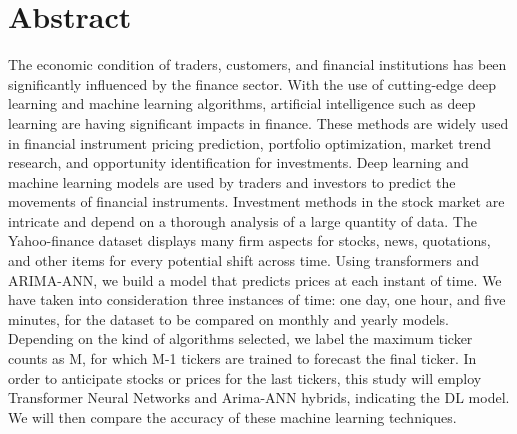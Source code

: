 \chapter*{\center \Large  Abstract}

The economic condition of traders, customers, and financial institutions has been significantly 
influenced by the finance sector. With the use of cutting-edge deep learning and machine 
learning algorithms, artificial intelligence such as deep learning are having significant impacts in finance. These methods are widely used in financial instrument pricing prediction, portfolio 
optimization, market trend research, and opportunity identification for investments. Deep 
learning and machine learning models are used by traders and investors to predict the movements 
of financial instruments. Investment methods in the stock market are intricate and depend on a 
thorough analysis of a large quantity of data. The Yahoo-finance dataset \cite{dataset} displays many firm 
aspects for stocks, news, quotations, and other items for every potential shift across time. 
Using transformers and ARIMA-ANN, we build a model that predicts prices at each instant of time. We have 
taken into consideration three instances of time: one day, one hour, and five minutes, for the 
dataset to be compared on monthly and yearly models. 
Depending on the kind of algorithms selected, we label the maximum ticker counts as M, for 
which M-1 tickers are trained to forecast the final ticker. In order to anticipate stocks or 
prices for the last tickers, this study will employ Transformer Neural Networks and Arima-ANN 
hybrids, indicating the DL model. We will then compare the accuracy of these machine learning 
techniques. 


